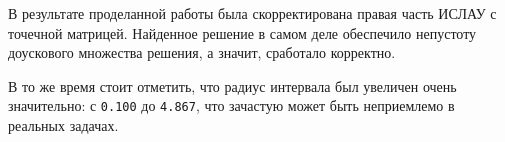 В результате проделанной работы была скорректирована правая часть ИСЛАУ с точечной матрицей. Найденное решение в самом деле обеспечило непустоту доускового множества решения, а значит, сработало корректно.

В то же время стоит отметить, что радиус интервала был увеличен очень значительно: с \texttt{0.100} до \texttt{4.867}, что зачастую может быть неприемлемо в реальных задачах.